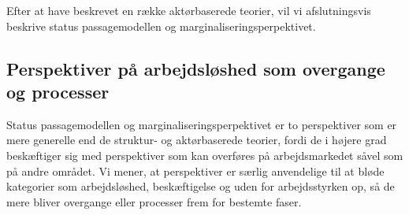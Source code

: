 Efter at have beskrevet en række aktørbaserede teorier, vil vi afslutningsvis beskrive status passagemodellen og marginaliseringsperpektivet.


\subsection{Perspektiver på arbejdsløshed som overgange og processer} 

Status passagemodellen og marginaliseringsperpektivet er to perspektiver som er mere generelle end de struktur- og aktørbaserede teorier, fordi de i højere grad beskæftiger sig med perspektiver som kan overføres på arbejdsmarkedet såvel som på andre området. Vi mener, at perspektiver er særlig anvendelige til at bløde kategorier som arbejdsløshed, beskæftigelse og uden for arbejdsstyrken op, så de mere bliver overgange eller processer frem for bestemte faser. %

